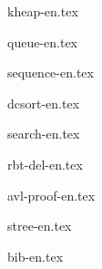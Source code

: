 \documentclass[b5paper,twoside]{book}
\begin{document}
{kheap-en.tex}

{queue-en.tex}

{sequence-en.tex}

{dcsort-en.tex}

{search-en.tex}

\appendix
\noappendicestocpagenum
\addappheadtotoc

{rbt-del-en.tex}

{avl-proof-en.tex}

{stree-en.tex}

{bib-en.tex}



\printindex
\end{document}
